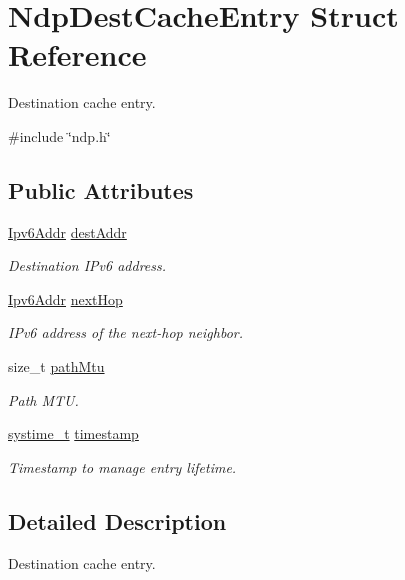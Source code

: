 \hypertarget{structNdpDestCacheEntry}{}\section{Ndp\+Dest\+Cache\+Entry Struct Reference}
\label{structNdpDestCacheEntry}


Destination cache entry.  




{\ttfamily \#include \char`\"{}ndp.\+h\char`\"{}}

\subsection*{Public Attributes}
\begin{DoxyCompactItemize}
\item 
\hyperlink{ipv6_8h_aed0cbc40c61ed5b4fb681ebc55237e89}{Ipv6\+Addr} \hyperlink{structNdpDestCacheEntry_a7ae9c14d0f1debbf7e5a756d4edb20ff}{dest\+Addr}
\begin{DoxyCompactList}\small\item\em Destination I\+Pv6 address. \end{DoxyCompactList}\item 
\hyperlink{ipv6_8h_aed0cbc40c61ed5b4fb681ebc55237e89}{Ipv6\+Addr} \hyperlink{structNdpDestCacheEntry_ad4faeec940b627f2b0c73d298fb2e605}{next\+Hop}
\begin{DoxyCompactList}\small\item\em I\+Pv6 address of the next-\/hop neighbor. \end{DoxyCompactList}\item 
size\+\_\+t \hyperlink{structNdpDestCacheEntry_aa9f02a7bf3d1a681861c8affd54e0354}{path\+Mtu}
\begin{DoxyCompactList}\small\item\em Path M\+TU. \end{DoxyCompactList}\item 
\hyperlink{compiler__port_8h_ae3e32a98d431a02106616da3071832dd}{systime\+\_\+t} \hyperlink{structNdpDestCacheEntry_a8474c35e89cb368fafe1e73ce9210f34}{timestamp}
\begin{DoxyCompactList}\small\item\em Timestamp to manage entry lifetime. \end{DoxyCompactList}\end{DoxyCompactItemize}


\subsection{Detailed Description}
Destination cache entry. 


